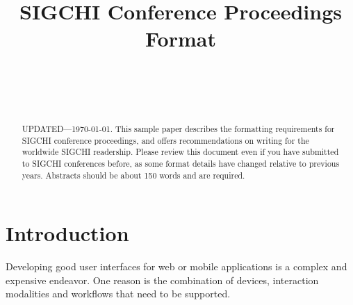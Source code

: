 \documentclass{sigchi}
\begin{document}
\title{SIGCHI Conference Proceedings Format}

\author{%
  \\
  \\
  \\
}

\maketitle

\begin{abstract}
  UPDATED---\today. This sample paper describes the
  formatting requirements for SIGCHI conference proceedings, and
  offers recommendations on writing for the worldwide SIGCHI
  readership. Please review this document even if you have submitted
  to SIGCHI conferences before, as some format details have changed
  relative to previous years. Abstracts should be about 150 words and
  are required.
\end{abstract}


 

\section{Introduction}

Developing good user interfaces for web or mobile applications is a
complex and expensive endeavor. One reason is the combination of
devices, interaction modalities and workflows that need to be
supported.
\end{document}
